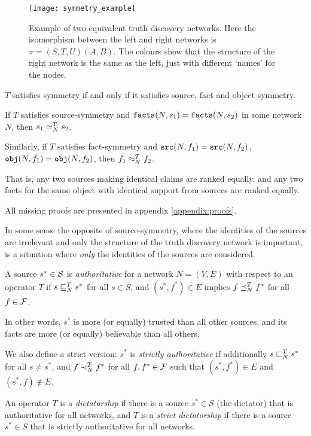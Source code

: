 \documentclass[../main.tex]{subfiles}
\begin{document}
\begin{figure}
    \centering
    \texttt{[image: symmetry\_example]}
    \caption{
        Example of two equivalent truth discovery networks. Here the
        isomorphism between the left and right networks is $\pi = (S, T, U)(A,
        B)$. The colours show that the structure of the right network is the
        same as the left, just with different `names' for the nodes.
    }
    \label{img:equivalent_networks}
\end{figure}

\begin{proposition}
\label{prop:symm_iff_fact_source_object_symm}
$T$ satisfies symmetry if and only if it satisfies source, fact and object
symmetry.
\end{proposition}

\begin{proposition}
\label{prop:same_facts_ranked_equally}
If $T$ satisfies source-symmetry and $\fact(N, s_1) = \fact(N, s_2)$ in some
network $N$, then $s_1 \seq_N^T s_2$.

Similarly, if $T$ satisfies fact-symmetry and $\src(N, f_1) = \src(N, f_2)$,
$\obj(N, f_1) = \obj(N, f_2)$, then $f_1 \feq_N^T f_2$.

That is, any two sources making identical claims are ranked equally, and any
two facts for the same object with identical support from sources are ranked
equally.
\end{proposition}

All missing proofs are presented in appendix \ref{appendix:proofs}.

In some sense the opposite of source-symmetry, where the identities of the
sources are irrelevant and only the structure of the truth discovery network is
important, is a situation where \emph{only} the identities of the sources are
considered.

\begin{definition}

A source $s^* \in \S$ is \emph{authoritative} for a network $N=(V, E)$ with
respect to an operator $T$ if $s \sle_N^T s^*$ for all $s \in S$, and $(s^*,
f^*) \in E$ implies $f \fle_N^T f^*$ for all $f \in \F$.

In other words, $s^*$ is more (or equally) trusted than all other sources, and
its facts are more (or equally) believable than all others.

We also define a strict version: $s^*$ is \emph{strictly authoritative} if
additionally $s \slt_N^T s^*$ for all $s \ne s^*$, and $f \flt_N^T f^*$ for all
$f, f^* \in \F$ such that $(s^*, f^*) \in E$ and $(s^*, f) \notin E$.

An operator $T$ is a \emph{dictatorship} if there is a source $s^* \in S$ (the
dictator) that is authoritative for all networks, and $T$ is a \emph{strict
dictatorship} if there is a source $s^* \in S$ that is strictly authoritative
for all networks.

\end{definition}
\end{document}

